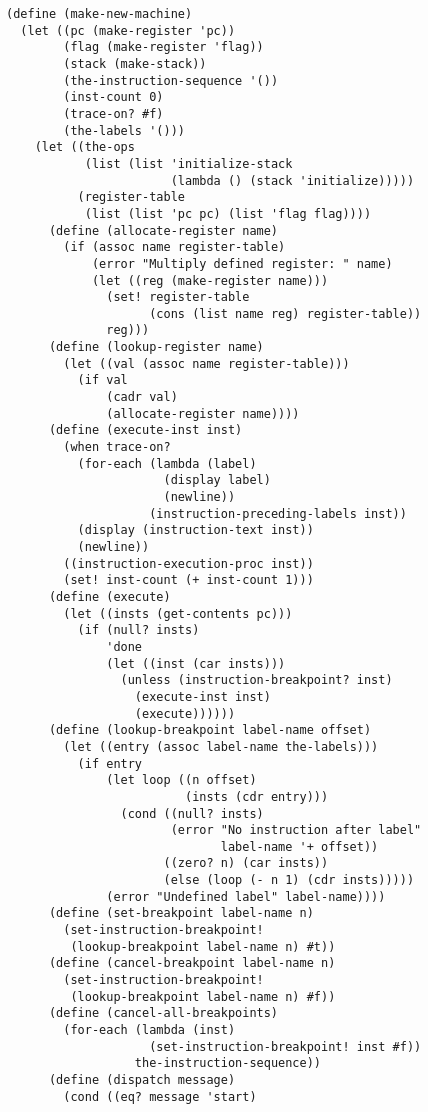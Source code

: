 \documentclass[a4paper,12pt]{article}
\begin{document}
\begin{lstlisting}
(define (make-new-machine)
  (let ((pc (make-register 'pc))
        (flag (make-register 'flag))
        (stack (make-stack))
        (the-instruction-sequence '())
        (inst-count 0)
        (trace-on? #f)
        (the-labels '()))
    (let ((the-ops
           (list (list 'initialize-stack
                       (lambda () (stack 'initialize)))))
          (register-table
           (list (list 'pc pc) (list 'flag flag))))
      (define (allocate-register name)
        (if (assoc name register-table)
            (error "Multiply defined register: " name)
            (let ((reg (make-register name)))
              (set! register-table
                    (cons (list name reg) register-table))
              reg)))
      (define (lookup-register name)
        (let ((val (assoc name register-table)))
          (if val
              (cadr val)
              (allocate-register name))))
      (define (execute-inst inst)
        (when trace-on?
          (for-each (lambda (label)
                      (display label)
                      (newline))
                    (instruction-preceding-labels inst))
          (display (instruction-text inst))
          (newline))
        ((instruction-execution-proc inst))
        (set! inst-count (+ inst-count 1)))
      (define (execute)
        (let ((insts (get-contents pc)))
          (if (null? insts)
              'done
              (let ((inst (car insts)))
                (unless (instruction-breakpoint? inst)
                  (execute-inst inst)
                  (execute))))))
      (define (lookup-breakpoint label-name offset)
        (let ((entry (assoc label-name the-labels)))
          (if entry
              (let loop ((n offset)
                         (insts (cdr entry)))
                (cond ((null? insts)
                       (error "No instruction after label"
                              label-name '+ offset))
                      ((zero? n) (car insts))
                      (else (loop (- n 1) (cdr insts)))))
              (error "Undefined label" label-name))))
      (define (set-breakpoint label-name n)
        (set-instruction-breakpoint!
         (lookup-breakpoint label-name n) #t))
      (define (cancel-breakpoint label-name n)
        (set-instruction-breakpoint!
         (lookup-breakpoint label-name n) #f))
      (define (cancel-all-breakpoints)
        (for-each (lambda (inst)
                    (set-instruction-breakpoint! inst #f))
                  the-instruction-sequence))
      (define (dispatch message)
        (cond ((eq? message 'start)

\end{lstlisting}
\end{document}
